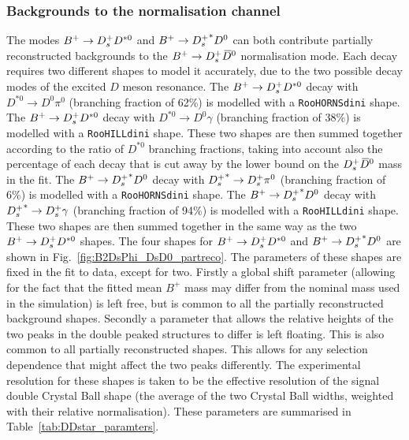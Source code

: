 \subsubsection{Backgrounds to the normalisation channel}
{\color{Blue}
The modes ${B}^+ \rightarrow {\ensuremath{{D}^+_{s}}} D^{*0}$ and ${B}^+ \rightarrow {\ensuremath{{D}^+_{s}}}^{*} D^{0}$ can both contribute partially reconstructed backgrounds to the ${{B}^+} \rightarrow {\ensuremath{{D}^+_{s}}} {\ensuremath{{\kern 0.2em\overline{\kern -0.2em D}{}}{}^0}}$ normalisation mode.
Each decay requires two different shapes to model it accurately, due to the two possible decay modes of the excited $D$ meson resonance.
The ${B}^+ \rightarrow {\ensuremath{{D}^+_{s}}} D^{*0}$ decay with $D^{*0} \to D^0 \pi^0$ (branching fraction of 62\%) is modelled with a \texttt{RooHORNSdini} shape.
The ${B}^+ \rightarrow {\ensuremath{{D}^+_{s}}} D^{*0}$ decay with $D^{*0} \to D^0 \gamma$ (branching fraction of 38\%) is modelled with a \texttt{RooHILLdini} shape.
These two shapes are then summed together according to the ratio of $D^{*0}$ branching fractions, taking into account also the percentage of each decay that is cut away by 
the lower bound on the ${{D}^+_{s}} {{\kern 0.2em\overline{\kern -0.2em D}{}}{}^0}$ mass in the fit.
The ${B}^+ \rightarrow {\ensuremath{{D}^+_{s}}}^{*} D^{0}$ decay with ${{D}^+_{s}}^{*} \rightarrow {\ensuremath{{D}^+_{s}}} \pi^0$ (branching fraction of 6\%) is modelled with a \texttt{RooHORNSdini} shape.
The ${B}^+ \rightarrow {\ensuremath{{D}^+_{s}}}^{*} D^{0}$ decay with ${{D}^+_{s}}^{*} \rightarrow {\ensuremath{{D}^+_{s}}} \gamma$ (branching fraction of 94\%) is modelled with a \texttt{RooHILLdini} shape.
These two shapes are then summed together in the same way as the two ${B}^+ \rightarrow {\ensuremath{{D}^+_{s}}} D^{*0}$ shapes.
The four shapes for ${B}^+ \rightarrow {\ensuremath{{D}^+_{s}}} D^{*0}$ and ${B}^+ \rightarrow {\ensuremath{{D}^+_{s}}}^{*} D^{0}$ are shown in Fig.~\ref{fig:B2DsPhi_DsD0_partreco}.
The parameters of these shapes are fixed in the fit to data, except for two. Firstly a global shift parameter (allowing for the fact that the fitted mean $B^+$ mass may differ from the nominal mass used in the simulation) is left free, but is common to all the partially reconstructed background shapes. Secondly a parameter that allows the relative heights of the two peaks in the double peaked structures to differ is left floating. This is also common to all partially reconstructed shapes. This allows for any selection dependence that might affect the two peaks differently.
The experimental resolution for these shapes is taken to be the effective resolution of the signal double Crystal Ball shape (\ie the average of the two Crystal Ball 
widths, weighted with their relative normalisation). These parameters are summarised in Table~\ref{tab:DDstar_paramters}.


}
